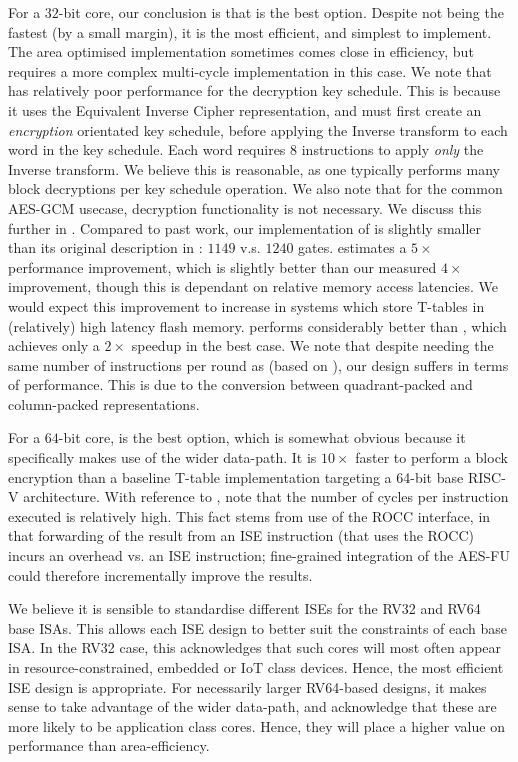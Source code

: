 For a $32$-bit core, our conclusion is that
is the best option.
Despite not being the fastest (by a small margin), it is the most efficient,
and simplest to implement.
The area optimised  implementation sometimes comes close in
efficiency, but requires a more complex multi-cycle implementation
in this case.
We note that  has relatively poor performance for the decryption
key schedule.
This is because it uses the Equivalent Inverse Cipher representation,
and must first create an {\em encryption} orientated key schedule, before
applying the Inverse  transform to each word in the key
schedule.
Each word requires $8$ instructions to apply {\em only} the Inverse  
transform. We believe this is reasonable, as one typically performs
many block decryptions per key schedule operation.
We also note that for the common AES-GCM usecase, decryption functionality
is not necessary. We discuss this further in .
Compared to past work, our implementation of  is
slightly smaller than its original description in \cite{Saarinen:20}:
$1149$ v.s. $1240$ gates.
\cite{Saarinen:20} estimates a $5\times$ performance improvement, which is
slightly better than our measured $4\times$ improvement, though this is
dependant on relative memory access latencies.
We would expect this improvement to increase in systems which store T-tables
in (relatively) high latency flash memory.
 performs considerably better than \cite{TilGroSze:05},
which achieves only a $2\times$ speedup in the best case.
We note that despite needing the same number of instructions per round
as  (based on \cite{TilGroSze:05}), our  design suffers in terms
of performance.
This is due to the conversion between quadrant-packed and column-packed
representations.

For a $64$-bit core,
is the best option, which is somewhat obvious because it specifically makes
use of the wider data-path.
It is $10\times$ faster to perform a block encryption than a baseline T-table
implementation targeting a 64-bit base RISC-V architecture.
With reference to
, 
note that the number of cycles per instruction executed is relatively high.
This fact stems from use of the ROCC interface, in that forwarding of the 
result from an ISE instruction (that uses the ROCC) incurs an overhead vs. 
an ISE instruction; fine-grained integration of the AES-FU could therefore
incrementally improve the results.

We believe it is sensible to standardise different ISEs for the
RV32 and RV64 base ISAs.
This allows each ISE design to better suit the constraints of each
base ISA.
In the RV32 case, this acknowledges that such cores will most often
appear in resource-constrained, embedded or IoT class devices.
Hence, the most efficient ISE design is appropriate.
For necessarily larger RV64-based designs, it makes sense to take advantage
of the wider data-path, and acknowledge that these are more likely to
be application class cores. Hence, they will place a higher value
on performance than area-efficiency.

